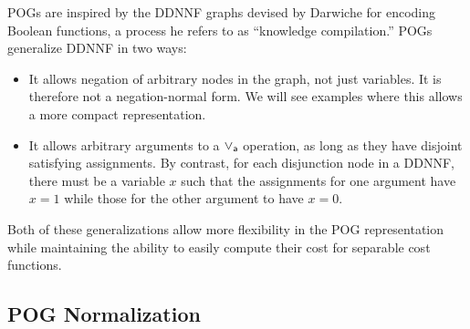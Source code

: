 \documentclass{llncs}
\newcommand{\por}{\mathbin{\lor_{\sf a}}}
\begin{document}
POGs are inspired by the DDNNF graphs devised by
Darwiche for encoding Boolean functions, a process he refers to as
``knowledge compilation.''
POGs generalize DDNNF in two ways:
\begin{itemize}
\item It allows negation of arbitrary nodes in the graph, not just
  variables.  It is therefore not a negation-normal form.  We will see
  examples where this allows a more compact representation.
\item It allows arbitrary arguments to a $\por$ operation, as long as
  they have disjoint satisfying assignments.  By contrast, for each
  disjunction node in a DDNNF, there must be a variable $x$ such that
  the assignments for one argument have $x=1$ while those for
  the other argument to have $x=0$.
\end{itemize}
  Both of these generalizations allow more flexibility in the POG
  representation while maintaining the ability to easily compute their
  cost for separable cost functions.



\subsection{POG Normalization}
\end{document}
